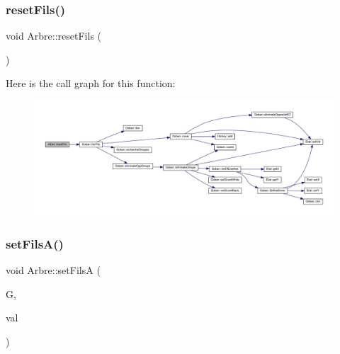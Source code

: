\subsubsection{\texorpdfstring{reset\+Fils()}{resetFils()}}
{\footnotesize\ttfamily void Arbre\+::reset\+Fils (\begin{DoxyParamCaption}{ }\end{DoxyParamCaption})}

Here is the call graph for this function\+:
\nopagebreak
\begin{figure}[H]
\begin{center}
\leavevmode
\includegraphics[width=350pt]{class_arbre_a70585b1d341c1e0c262b2b4a4f769b6d_cgraph}
\end{center}
\end{figure}
\mbox{\label{class_arbre_aceca304216a7f620926c2147c7c84acd}} 
\subsubsection{\texorpdfstring{set\+Fils\+A()}{setFilsA()}}
{\footnotesize\ttfamily void Arbre\+::set\+FilsA (\begin{DoxyParamCaption}\item[{\hyperlink{class_goban}{Goban} \&}]{G,  }\item[{\hyperlink{class_etat_af3ddb2296ffc379b7f3ad2bf832f294e}{Etat\+::\+V\+AL}}]{val }\end{DoxyParamCaption})}

